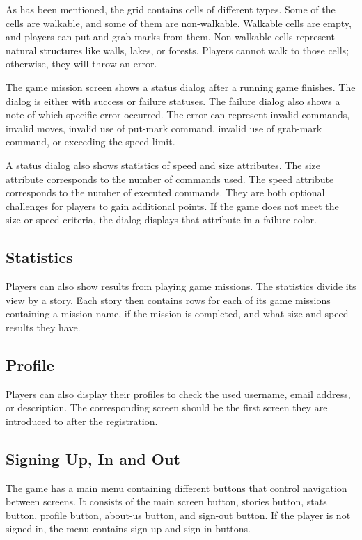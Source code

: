 As has been mentioned, the grid contains cells of different types.
Some of the cells are walkable, and some of them are non-walkable.
Walkable cells are empty, and players can put and grab marks from them.
Non-walkable cells represent natural structures like walls, lakes, or forests.
Players cannot walk to those cells; otherwise, they will throw an error.

The game mission screen shows a status dialog after a running game finishes.
The dialog is either with success or failure statuses.
The failure dialog also shows a note of which specific error occurred.
The error can represent invalid commands, invalid moves, invalid use of put-mark command, invalid use of grab-mark command, or exceeding the speed limit.

A status dialog also shows statistics of speed and size attributes.
The size attribute corresponds to the number of commands used.
The speed attribute corresponds to the number of executed commands.
They are both optional challenges for players to gain additional points.
If the game does not meet the size or speed criteria, the dialog displays that attribute in a failure color.

\subsection{Statistics}
\label{analysis:game:statistics}

Players can also show results from playing game missions.
The statistics divide its view by a story.
Each story then contains rows for each of its game missions containing a mission name, if the mission is completed, and what size and speed results they have.

\subsection{Profile}
\label{analysis:game:profile}

Players can also display their profiles to check the used username, email address, or description.
The corresponding screen should be the first screen they are introduced to after the registration.

\subsection{Signing Up, In and Out}
\label{analysis:game:sign-up-in-out}

The game has a main menu containing different buttons that control navigation between screens.
It consists of the main screen button, stories button, stats button, profile button, about-us button, and sign-out button.
If the player is not signed in, the menu contains sign-up and sign-in buttons.

